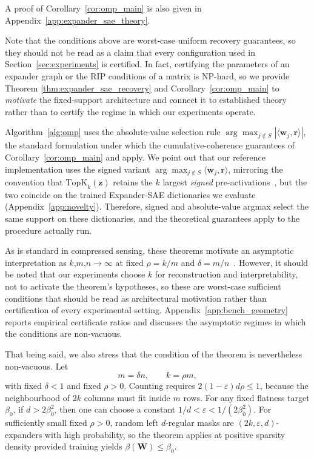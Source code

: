 \documentclass{article}
\theoremstyle{plain}
\theoremstyle{definition}
\theoremstyle{remark}
\begin{document}
A proof of Corollary~\ref{cor:omp_main} is also given in Appendix~\ref{app:expander_sae_theory}.

Note that the conditions above are worst-case uniform recovery guarantees, so they should not be read as a claim that every configuration used in Section~\ref{sec:experiments} is certified.
%
In fact, certifying the parameters of an expander graph or the RIP conditions of a matrix is NP-hard, so we provide Theorem \ref{thm:expander_sae_recovery} and Corollary~\ref{cor:omp_main} to \emph{motivate} the fixed-support architecture and connect it to established theory rather than to certify the regime in which our experiments operate.

Algorithm~\ref{alg:omp} uses the absolute-value selection rule $\arg\max_{j \notin S} |\langle \mathbf{w}_j, \mathbf{r} \rangle|$, the standard formulation under which the cumulative-coherence guarantees of Corollary~\ref{cor:omp_main} and \citet{tropp2007omp} apply.
%
We point out that our reference implementation uses the signed variant $\arg\max_{j \notin S} \langle \mathbf{w}_j, \mathbf{r} \rangle$, mirroring the convention that $\mathrm{TopK}_k(\mathbf{z})$ retains the $k$ largest \emph{signed} pre-activations~\citep{gao2024scaling}, but the two coincide on the trained Expander-SAE dictionaries we evaluate (Appendix~\ref{app:novelty}).
%
Therefore, signed and absolute-value argmax select the same support on these dictionaries, and the theoretical guarantees apply to the procedure actually run.


As is standard in compressed sensing, these theorems motivate an asymptotic interpretation as $k$,$m$,$n \rightarrow \infty$ at fixed $\rho=k/m$ and $\delta=m/n$~\citep{donoho2009observed}.
%
However, it should be noted that our experiments choose $k$ for reconstruction and interpretability, not to activate the theorem's hypotheses, so these are worst-case sufficient conditions that should be read as architectural motivation rather than certification of every experimental setting.
%
Appendix~\ref{app:bench_geometry} reports empirical certificate ratios and discusses the asymptotic regimes in which the conditions are non-vacuous.

That being said, we also stress that the condition of the theorem is nevertheless non-vacuous.
%
Let
\[
    m=\delta n,
    \qquad
    k=\rho m,
\]
with fixed \(\delta<1\) and fixed \(\rho>0\).
%
Counting requires \(2(1-\varepsilon)d\rho\le 1\), because the neighbourhood of \(2k\) columns must fit inside \(m\) rows.
%
For any fixed flatness target \(\beta_0\), if \(d>2\beta_0^2\), then one can choose a constant \(1/d<\varepsilon<1/(2\beta_0^2)\).
%
For sufficiently small fixed \(\rho>0\), random left \(d\)-regular masks are \((2k,\varepsilon,d)\)-expanders with high probability, so the theorem applies at positive sparsity density provided training yields \(\beta(\mathbf{W})\le\beta_0\).
\end{document}

